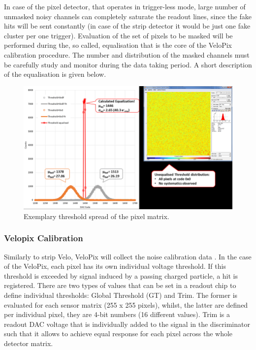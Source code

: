 In case of the pixel detector, that operates in trigger-less mode, large number of unmasked noisy channels can completely saturate the readout lines, since the fake hits will be sent constantly (in case of the strip detector it would be just one fake cluster per one trigger). Evaluation of the set of pixels to be masked will be performed during the, so called, equalisation that is the core of the VeloPix calibration procedure. The number and distribution of the masked channels must be carefully study and monitor during the data taking period. A short description of the equalisation is given below.





\begin{figure}
    \centering
    \includegraphics[width=0.7\linewidth]{figures/chapter2/Threshold-spread-in-the-pixel-matrix.png}
    \caption{Exemplary threshold spread of the pixel matrix.}
    \label{plot:velopix_thresholding}
\end{figure}


\subsubsection{Velopix Calibration}
Similarly to strip Velo, VeloPix will collect the noise calibration data \cite{Kopciewicz:2723996}. 
In the case of the VeloPix, each pixel has its own individual voltage threshold. If this
threshold is exceeded by signal induced by a passing charged particle, a hit is registered.
There are two types of values that can be set in a readout chip to define individual thresholds: Global Threshold (GT) and Trim.
The former is evaluated for each sensor matrix (255 x 255 pixels), whilst, the latter are defined per individual pixel,  they are 4-bit numbers (16 different values).
Trim is a readout DAC voltage that is individually added to the signal in the discriminator such that it allows to achieve equal response for each pixel across the whole detector matrix.

